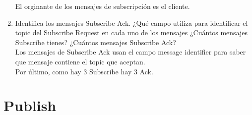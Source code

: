 \documentclass[12pt, a4paper]{report}
\begin{document}
\begin{enumerate}
	El orginante de los mensajes de subscripción es el cliente. 
	\item Identifica los mensajes Subscribe Ack. ¿Qué campo utiliza para identificar el topic del Subscribe
	Request en cada uno de los mensajes ¿Cuántos mensajes Subscribe tienes? ¿Cuántos mensajes
	Subscribe Ack?\\
	
	Los mensajes de Subscribe Ack usan el campo message identifier para saber que mensaje contiene el topic que aceptan.\\
	
	Por último, como hay 3 Subscribe hay 3 Ack.
	
\end{enumerate}
\chapter{Publish}
\end{document}
